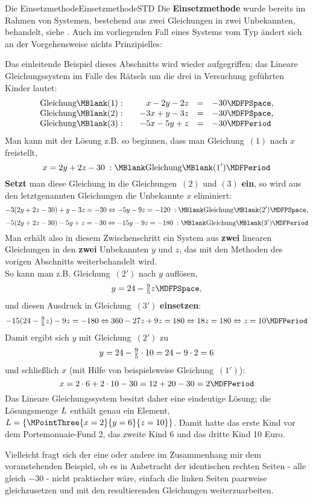 \begin{MXContent}{Die Einsetzmethode}{Einsetzmethode}{STD}
Die \textbf{Einsetzmethode} wurde bereits im Rahmen von Systemen, bestehend aus zwei Gleichungen
in zwei Unbekannten, behandelt, siehe . Auch im vorliegenden Fall eines
Systems vom Typ  ändert sich an der Vorgehensweise nichts Prinzipielles:
\begin{MExample}
Das einleitende Beispiel  dieses Abschnitts wird wieder aufgegriffen; das Lineare
Gleichungssystem im Falle des Rätsels um die drei in Versuchung geführten Kinder lautet:
$$\begin{array}{lcrcl} \mbox{Gleichung}\MBlank (1): & & x - 2 y - 2 z & = & - 30 \MDFPSpace, \\
\mbox{Gleichung}\MBlank (2): & & - 3 x + y - 3 z & = & - 30 \MDFPSpace, \\
\mbox{Gleichung}\MBlank (3): & & - 5 x - 5 y + z & = & - 30 \MDFPeriod \end{array}$$
Man kann mit der Lösung z.B. so beginnen, dass man Gleichung~$(1)$ nach $x$ freistellt,
$$x = 2 y + 2 z - 30 \; : \MBlank\mbox{Gleichung}\MBlank (1') \MDFPeriod$$
\textbf{Setzt} man diese Gleichung in die Gleichungen~$(2)$ und $(3)$ \textbf{ein}, so wird aus den
letztgenannten Gleichungen die Unbekannte $x$ eliminiert:
$$- 3 (2 y + 2 z - 30) + y - 3 z = - 30 \Leftrightarrow - 5 y - 9 z = - 120 \; : \MBlank\mbox{Gleichung}\MBlank (2') \MDFPSpace, $$
$$- 5 (2 y + 2 z - 30) - 5 y + z = - 30 \Leftrightarrow - 15 y - 9 z = - 180 \; : \MBlank\mbox{Gleichung}\MBlank (3') \MDFPeriod $$
Man erhält also in diesem Zwischenschritt ein System aus \textbf{zwei} linearen Gleichungen in den \textbf{zwei}
Unbekannten $y$ und $z$, das mit den Methoden des vorigen Abschnitts  weiterbehandelt wird.\\
So kann man z.B. Gleichung~$(2')$ nach $y$ auflösen,
$$y = 24 - \Mtfrac95 z \MDFPSpace ,$$
und diesen Ausdruck in Gleichung~$(3')$ \textbf{einsetzen}:
$$- 15 (24 - \Mtfrac95 z) - 9 z = - 180 \Leftrightarrow 360 - 27 z + 9 z = 180 \Leftrightarrow 18 z = 180
\Leftrightarrow z = 10 \MDFPeriod$$
Damit ergibt sich $y$ mit Gleichung~$(2')$ zu %
$$y = 24 - \tfrac{9}{5} \cdot 10 = 24 - 9 \cdot 2 = 6 $$
und schließlich $x$ (mit Hilfe von beispielsweise Gleichung~$(1')$):
$$x = 2 \cdot 6 + 2 \cdot 10 - 30 = 12 + 20 - 30 = 2 \MDFPeriod$$
Das Lineare Gleichungssystem besitzt daher eine eindeutige Lösung; die Lösungsmenge $L$ enthält genau
ein Element, ${\ML} = \{ \MPointThree{x = 2}{y = 6}{z = 10} \}$. Damit hatte das erste Kind vor dem Portemonnaie-Fund 2, das zweite Kind 6 und das dritte Kind 10 Euro.%
\end{MExample}
Vielleicht fragt sich der eine oder andere im Zusammenhang mir dem voranstehenden Beispiel, ob es in Anbetracht
der identischen rechten Seiten - alle gleich $- 30$ - nicht praktischer wäre, einfach die linken Seiten paarweise
gleichzusetzen und mit den resultierenden Gleichungen weiterzuarbeiten.


\end{MXContent}
